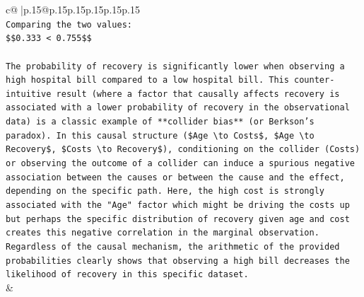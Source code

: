 \documentclass{article}
\begin{document}
{\begin{supertabular}{c@{$\;$}|p{.15\linewidth}@{}p{.15\linewidth}p{.15\linewidth}p{.15\linewidth}p{.15\linewidth}p{.15\linewidth}}
{{{\\ 
\texttt{Comparing the two values:} \\
\texttt{\$\$0.333 < 0.755\$\$} \\
\\ 
\texttt{The probability of recovery is significantly lower when observing a high hospital bill compared to a low hospital bill. This counter{-}intuitive result (where a factor that causally affects recovery is associated with a lower probability of recovery in the observational data) is a classic example of **collider bias** (or Berkson's paradox). In this causal structure (\$Age \textbackslash{}to Costs\$, \$Age \textbackslash{}to Recovery\$, \$Costs \textbackslash{}to Recovery\$), conditioning on the collider (Costs) or observing the outcome of a collider can induce a spurious negative association between the causes or between the cause and the effect, depending on the specific path. Here, the high cost is strongly associated with the "Age" factor which might be driving the costs up but perhaps the specific distribution of recovery given age and cost creates this negative correlation in the marginal observation. Regardless of the causal mechanism, the arithmetic of the provided probabilities clearly shows that observing a high bill decreases the likelihood of recovery in this specific dataset.} \\
            }
        }
    }
    & \\ \\


\end{supertabular}}
\end{document}
